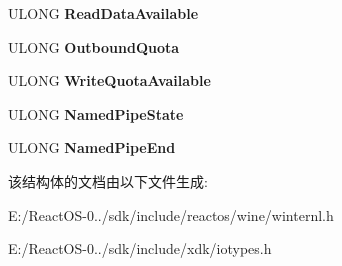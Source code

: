 \begin{DoxyCompactItemize}
U\+L\+O\+NG {\bfseries Read\+Data\+Available}
\item 
\mbox{\label{struct___f_i_l_e___p_i_p_e___l_o_c_a_l___i_n_f_o_r_m_a_t_i_o_n_a78cea8075f727be6869b921bf962aa1f}} 
U\+L\+O\+NG {\bfseries Outbound\+Quota}
\item 
\mbox{\label{struct___f_i_l_e___p_i_p_e___l_o_c_a_l___i_n_f_o_r_m_a_t_i_o_n_aada1fa6e9bb4cbfa993e193bbf9e8552}} 
U\+L\+O\+NG {\bfseries Write\+Quota\+Available}
\item 
\mbox{\label{struct___f_i_l_e___p_i_p_e___l_o_c_a_l___i_n_f_o_r_m_a_t_i_o_n_adf59edd8eba654083da24ad10d9b9aed}} 
U\+L\+O\+NG {\bfseries Named\+Pipe\+State}
\item 
\mbox{\label{struct___f_i_l_e___p_i_p_e___l_o_c_a_l___i_n_f_o_r_m_a_t_i_o_n_a7dbf545bce71111820d5ab4b23473040}} 
U\+L\+O\+NG {\bfseries Named\+Pipe\+End}
\end{DoxyCompactItemize}


该结构体的文档由以下文件生成\+:\begin{DoxyCompactItemize}
\item 
E\+:/\+React\+O\+S-\/0../sdk/include/reactos/wine/winternl.\+h\item 
E\+:/\+React\+O\+S-\/0../sdk/include/xdk/iotypes.\+h\end{DoxyCompactItemize}
